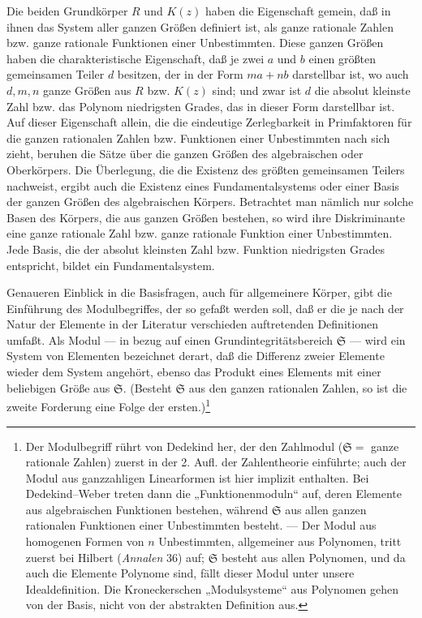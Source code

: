 \documentclass[11pt]{article}
\providecommand{\frS}{\mathfrak S}
\begin{document}
Die beiden Grundkörper \(R\) und \(K(z)\) haben die Eigenschaft gemein, daß in ihnen das System aller ganzen Größen definiert ist, als ganze rationale Zahlen bzw. ganze rationale Funktionen einer Unbestimmten. Diese ganzen Größen haben die charakteristische Eigenschaft, daß je zwei \(a\) und \(b\) einen größten gemeinsamen Teiler \(d\) besitzen, der in der Form \(ma+nb\) darstellbar ist, wo auch \(d,m,n\) ganze Größen aus \(R\) bzw. \(K(z)\) sind; und zwar ist \(d\) die absolut kleinste Zahl bzw. das Polynom niedrigsten Grades, das in dieser Form darstellbar ist. Auf dieser Eigenschaft allein, die die eindeutige Zerlegbarkeit in Primfaktoren für die ganzen rationalen Zahlen bzw. Funktionen einer Unbestimmten nach sich zieht, beruhen die Sätze über die ganzen Größen des algebraischen oder Oberkörpers. Die Überlegung, die die Existenz des größten gemeinsamen Teilers nachweist, ergibt auch die Existenz eines Fundamentalsystems oder einer Basis der ganzen Größen des algebraischen Körpers. Betrachtet man nämlich nur solche Basen des Körpers, die aus ganzen Größen bestehen, so wird ihre Diskriminante eine ganze rationale Zahl bzw. ganze rationale Funktion einer Unbestimmten. Jede Basis, die der absolut kleinsten Zahl bzw. Funktion niedrigsten Grades entspricht, bildet ein Fundamentalsystem.

Genaueren Einblick in die Basisfragen, auch für allgemeinere Körper, gibt die Einführung des Modulbegriffes, der so gefaßt werden soll, daß er die je nach der Natur der Elemente in der Literatur verschieden auftretenden Definitionen umfaßt. Als Modul --- in bezug auf einen Grundintegritätsbereich \(\frS\) --- wird ein System von Elementen bezeichnet derart, daß die Differenz zweier Elemente wieder dem System angehört, ebenso das Produkt eines Elements mit einer beliebigen Größe aus \(\frS\). (Besteht \(\frS\) aus den ganzen rationalen Zahlen, so ist die zweite Forderung eine Folge der ersten.)\footnote{Der Modulbegriff rührt von Dedekind her, der den Zahlmodul (\(\frS=\) ganze rationale Zahlen) zuerst in der 2. Aufl. der Zahlentheorie einführte; auch der Modul aus ganzzahligen Linearformen ist hier implizit enthalten. Bei Dedekind--Weber treten dann die „Funktionenmoduln“ auf, deren Elemente aus algebraischen Funktionen bestehen, während \(\frS\) aus allen ganzen rationalen Funktionen einer Unbestimmten besteht. --- Der Modul aus homogenen Formen von \(n\) Unbestimmten, allgemeiner aus Polynomen, tritt zuerst bei Hilbert (\emph{Annalen} 36) auf; \(\frS\) besteht aus allen Polynomen, und da auch die Elemente Polynome sind, fällt dieser Modul unter unsere Idealdefinition. Die Kroneckerschen „Modulsysteme“ aus Polynomen gehen von der Basis, nicht von der abstrakten Definition aus.}
\end{document}
